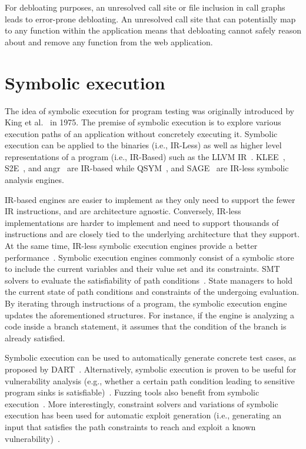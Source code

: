 For debloating purposes, an unresolved call site or file inclusion in call graphs leads to error-prone debloating. 
An unresolved call site that can potentially map to any function within the application means that debloating cannot safely reason about and remove any function from the web application. 

\section{Symbolic execution}

The idea of symbolic execution for program testing was originally introduced by King et al.~\cite{king1976symbolic} in 1975. 
The premise of symbolic execution is to explore various execution paths of an application without concretely executing it. 
Symbolic execution can be applied to the binaries (i.e., IR-Less) as well as higher level representations of a program (i.e., IR-Based) such as the LLVM IR~\cite{llvmir}. 
KLEE~\cite{cadar2008klee}, S2E~\cite{chipounov2009selective}, and angr~\cite{cheng2016binary} are IR-based while QSYM~\cite{yun2018qsym}, and SAGE~\cite{godefroid2012sage} are IR-less symbolic analysis engines. 

IR-based engines are easier to implement as they only need to support the fewer IR instructions, and are architecture agnostic. 
Conversely, IR-less implementations are harder to implement and need to support thousands of instructions and are closely tied to the underlying architecture that they support. 
At the same time, IR-less symbolic execution engines provide a better performance~\cite{poeplau2019systematic}.
Symbolic execution engines commonly consist of a symbolic store to include the current variables and their value set and its constraints. 
SMT solvers to evaluate the satisfiability of path conditions~\cite{moura2008z3}. 
State managers to hold the current state of path conditions and constraints of the undergoing evaluation. 
By iterating through instructions of a program, the symbolic execution engine updates the aforementioned structures. 
For instance, if the engine is analyzing a code inside a branch statement, it assumes that the condition of the branch is already satisfied. 

Symbolic execution can be used to automatically generate concrete test cases, as proposed by DART~\cite{sen2009dart, sen2005cute}. 
Alternatively, symbolic execution is proven to be useful for vulnerability analysis (e.g., whether a certain path condition leading to sensitive program sinks is satisfiable)~\cite{5504701, wang2009intscope, cha2012unleashing, cadar2008klee}. 
Fuzzing tools also benefit from symbolic execution~\cite{godefroid2012sage}.
More interestingly, constraint solvers and variations of symbolic execution has been used for automatic exploit generation (i.e., generating an input that satisfies the path constraints to reach and exploit a known vulnerability)~\cite{alhuzali2018navex, avgerinos2014automatic}.

